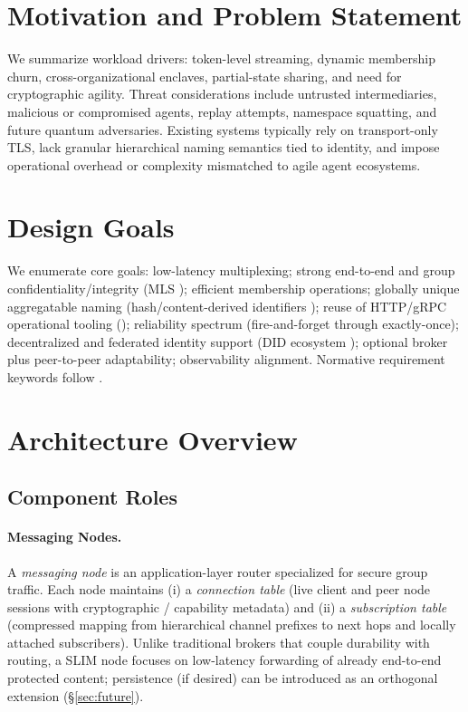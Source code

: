 \documentclass{article}
\theoremstyle{definition}
\theoremstyle{remark}
\begin{document}
\section{Motivation and Problem Statement}\label{sec:motivation}
We summarize workload drivers: token-level streaming, dynamic membership churn,
cross-organizational enclaves, partial-state sharing, and need for
cryptographic agility. Threat considerations include untrusted intermediaries,
malicious or compromised agents, replay attempts, namespace squatting, and
future quantum adversaries. Existing systems typically rely on transport-only
TLS, lack granular hierarchical naming semantics tied to identity, and impose
operational overhead or complexity mismatched to agile agent ecosystems.

\section{Design Goals}\label{sec:goals}
We enumerate core goals: low-latency multiplexing; strong end-to-end and group
confidentiality/integrity (MLS \citep{rfc9420}); efficient membership
operations; globally unique aggregatable naming (hash/content-derived
identifiers \citep{rfc6920}); reuse of HTTP/gRPC operational tooling
(\citep{grpc,http2}); reliability spectrum (fire-and-forget through
exactly-once); decentralized and federated identity support (DID ecosystem
\citep{didcore,didmethods}); optional broker plus peer-to-peer adaptability;
observability alignment. Normative requirement keywords follow
\citep{rfc2119,rfc8174}.

\section{Architecture Overview}\label{sec:architecture}
\subsection{Component Roles}
\paragraph{Messaging Nodes.} A \emph{messaging node} is an application-layer
router specialized for secure group traffic. Each node maintains (i) a
\emph{connection table} (live client and peer node sessions with cryptographic
/ capability metadata) and (ii) a \emph{subscription table} (compressed
mapping from hierarchical channel prefixes to next hops and locally attached
subscribers). Unlike traditional brokers that couple durability with routing,
a SLIM node focuses on low-latency forwarding of already end-to-end protected
content; persistence (if desired) can be introduced as an orthogonal extension
(\S\ref{sec:future}).
\end{document}
